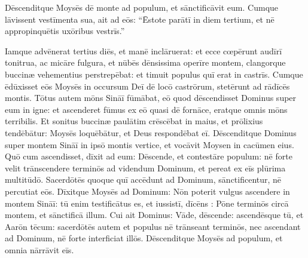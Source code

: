 Dēscenditque Moysēs dē monte ad populum, et sānctificāvit eum. Cumque
lāvissent vestīmenta sua, 
ait ad eōs: ``Ēstote parātī in diem tertium, et
nē appropinquētis uxōribus vestrīs.''

Iamque advēnerat tertius diēs, et
manē inclāruerat: et ecce cœpērunt audīrī tonitrua, ac
micāre fulgura, et nūbēs dēnsissima operīre montem, clangorque
buccinæ vehementius
perstrepēbat: et timuit populus quī erat in castrīs. 
Cumque ēdūxisset
eōs Moysēs in occursum Deī dē locō castrōrum, stetērunt ad
rādīcēs montis. 
Tōtus autem mōns Sināī
fūmābat, eō quod dēscendisset Dominus super eum in igne:
et ascenderet fūmus ex eō quasi dē fornāce,
eratque omnis mōns terribilis. 
Et sonitus buccinæ
paulātim crēscēbat in maius, et prōlixius
tendēbātur: Moysēs loquēbātur, et Deus respondēbat eī. 
Dēscenditque
Dominus super montem Sināī in ipsō montis vertice, et vocāvit Moysen in
cacūmen eius. Quō cum ascendisset, 
dīxit ad eum:
Dēscende, et contestāre populum: nē forte velit
trānscendere terminōs ad videndum Dominum, et
pereat ex eīs plūrima multitūdō. 
Sacerdōtēs quoque quī accēdunt ad
Dominum, sānctificentur, nē percutiat eōs. 
Dīxitque Moysēs ad Dominum:
Nōn poterit vulgus ascendere in
montem Sināī: tū enim testificātus es, et iussistī, dīcēns
: Pōne terminōs circā montem, et sānctificā illum. 
Cui ait Dominus:
Vāde, dēscende: ascendēsque tū, et Aarōn tēcum: sacerdōtēs autem et
populus nē trānseant terminōs, nec ascendant ad Dominum, nē forte
interficiat illōs. 
Dēscenditque Moysēs ad populum, et omnia nārrāvit
eīs.
